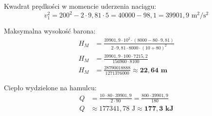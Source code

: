 \documentclass[a4paper,12pt]{article}
\begin{document}
Kwadrat prędkości w momencie uderzenia naciągu:
\begin{equation*}
v_1^2 = 200^2 - 2 \cdot 9,81 \cdot 5 = 40000 - 98,1 = 39901,9 \text{ m}^2/\text{s}^2
\end{equation*}

Maksymalna wysokość barona:
\begin{align*}
H_M &= \frac{39901,9 \cdot 10^2 \cdot (8000 - 80 \cdot 9,81)}{2 \cdot 9,81 \cdot 8000 \cdot (10+80)^2} \\
H_M &= \frac{39901,9 \cdot 100 \cdot 7215,2}{156960 \cdot 8100} \\
H_M &= \frac{28790018888}{1271376000} \approx \mathbf{22,64 \text{ m}}
\end{align*}

Ciepło wydzielone na hamulcu:
\begin{align*}
Q &= \frac{10 \cdot 80 \cdot 39901,9}{2 \cdot 90} = \frac{800 \cdot 39901,9}{180} \\
Q &\approx 177341,78 \text{ J} \approx \mathbf{177,3 \text{ kJ}}
\end{align*}
\end{document}
